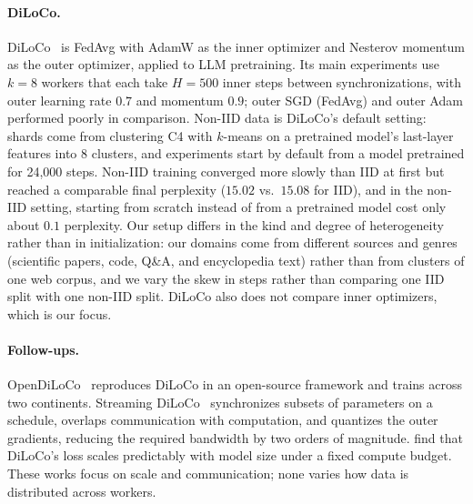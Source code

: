 \documentclass{article}
\begin{document}
\paragraph{DiLoCo.} DiLoCo~\cite{douillard2023diloco} is FedAvg with AdamW as the inner optimizer and Nesterov momentum as the outer optimizer, applied to LLM pretraining. Its main experiments use $k=8$ workers that each take $H=500$ inner steps between synchronizations, with outer learning rate $0.7$ and momentum $0.9$; outer SGD (FedAvg) and outer Adam performed poorly in comparison. Non-IID data is DiLoCo's default setting: shards come from clustering C4 with $k$-means on a pretrained model's last-layer features into 8 clusters, and experiments start by default from a model pretrained for 24{,}000 steps. Non-IID training converged more slowly than IID at first but reached a comparable final perplexity ($15.02$ vs.\ $15.08$ for IID), and in the non-IID setting, starting from scratch instead of from a pretrained model cost only about $0.1$ perplexity. Our setup differs in the kind and degree of heterogeneity rather than in initialization: our domains come from different sources and genres (scientific papers, code, Q\&A, and encyclopedia text) rather than from clusters of one web corpus, and we vary the skew in steps rather than comparing one IID split with one non-IID split. DiLoCo also does not compare inner optimizers, which is our focus.

\paragraph{Follow-ups.} OpenDiLoCo~\cite{jaghouar2024opendiloco} reproduces DiLoCo in an open-source framework and trains across two continents. Streaming DiLoCo~\cite{douillard2025streaming} synchronizes subsets of parameters on a schedule, overlaps communication with computation, and quantizes the outer gradients, reducing the required bandwidth by two orders of magnitude. \citet{charles2025scaling} find that DiLoCo's loss scales predictably with model size under a fixed compute budget. These works focus on scale and communication; none varies how data is distributed across workers.
\end{document}
